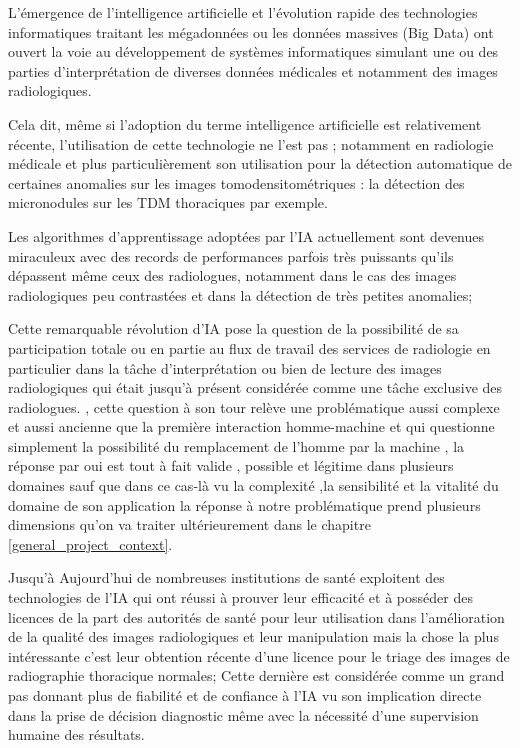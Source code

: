 \documentclass[12pt]{report}
\begin{document}
    L'émergence de l’intelligence artificielle et l’évolution rapide des technologies informatiques traitant les mégadonnées ou les données massives (Big Data) ont ouvert la voie au développement de systèmes informatiques simulant une ou des parties d’interprétation de diverses données médicales et notamment des images radiologiques.
    
    Cela dit, même si l'adoption du terme intelligence artificielle est relativement récente, l'utilisation de cette technologie ne l'est pas ; notamment en radiologie médicale et plus particulièrement son utilisation pour la détection automatique de certaines anomalies sur les images tomodensitométriques : la détection des micronodules sur les TDM thoraciques par exemple.

    Les algorithmes d’apprentissage adoptées par l’IA actuellement sont devenues miraculeux avec des records de performances parfois très puissants qu’ils dépassent même ceux des radiologues, notamment dans le cas des images radiologiques peu contrastées et dans la détection de très petites anomalies; 

    Cette remarquable révolution d’IA pose la question de la possibilité de sa participation totale ou en partie au flux de travail des services de radiologie en particulier dans la tâche d'interprétation ou bien de lecture des images radiologiques qui était jusqu'à présent considérée comme une tâche exclusive des radiologues. , cette question à son tour relève une problématique aussi complexe et aussi ancienne que la première interaction homme-machine et qui questionne simplement la possibilité du remplacement de l’homme par la machine , la réponse par oui  est tout à fait valide , possible et légitime dans plusieurs domaines sauf que dans ce cas-là vu la complexité ,la sensibilité et la vitalité du domaine de son application la réponse à notre problématique prend plusieurs dimensions qu’on va traiter ultérieurement dans le chapitre \ref{general_project_context}.

    Jusqu'à Aujourd'hui de nombreuses institutions de santé exploitent des technologies de l’IA qui ont réussi à prouver leur efficacité et à posséder des licences de la part des autorités de santé pour leur utilisation dans l'amélioration de la qualité des images radiologiques et leur manipulation mais la chose la plus intéressante c'est leur obtention récente d’une licence pour le triage des images de radiographie thoracique normales; Cette dernière est considérée comme un grand pas donnant plus de fiabilité et de confiance à l’IA  vu son implication directe dans la prise de décision diagnostic même avec la nécessité d’une supervision humaine des résultats.
\end{document}

